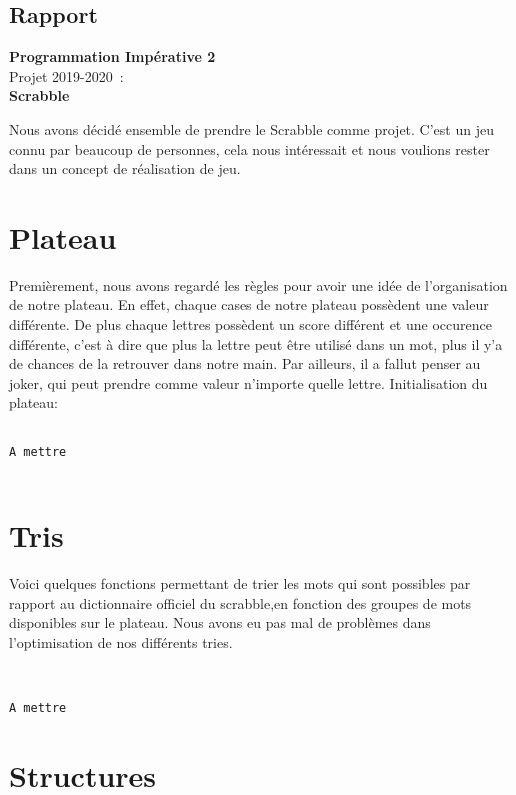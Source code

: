 \documentclass[a4paper]{article}
\begin{document}
\begin{center}\section*{Rapport}
{\Large\bf
Programmation Impérative 2\\}
Projet 2019-2020~: \\
\textbf{Scrabble}
\end{center}

Nous avons décidé ensemble de prendre le Scrabble comme projet. C'est un jeu connu par beaucoup de personnes, cela nous intéressait et nous voulions rester dans un concept de réalisation de jeu.

\section{Plateau}


Premièrement, nous avons regardé les règles pour avoir une idée de l'organisation de notre plateau. En effet, chaque cases de notre plateau possèdent une valeur différente. De plus chaque lettres possèdent un score différent et une occurence différente, c'est à dire que plus la lettre peut être utilisé dans un mot, plus il y'a de chances de la retrouver dans notre main. Par ailleurs, il a fallut penser au joker, qui peut prendre comme valeur n'importe quelle lettre.
Initialisation du plateau:
\begin{verbatim}
  
A mettre 


\end{verbatim}



\section{Tris}

Voici quelques fonctions permettant de trier les mots qui sont possibles par rapport au dictionnaire officiel du scrabble,en fonction des groupes de mots disponibles sur le plateau. Nous avons eu pas mal de problèmes dans l'optimisation de nos différents tries.
\\

\begin{verbatim}


A mettre 
\end{verbatim}


\section{Structures}
\end{document}
